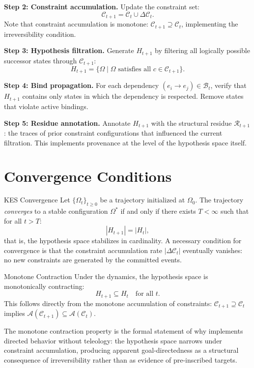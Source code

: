 \textbf{Step 2: Constraint accumulation.} Update the constraint set:
\[
  \mathcal{C}_{t+1} = \mathcal{C}_t \cup \Delta\mathcal{C}_t.
\]
Note that constraint accumulation is monotone: $\mathcal{C}_{t+1} \supseteq
\mathcal{C}_t$, implementing the irreversibility condition.

\textbf{Step 3: Hypothesis filtration.} Generate $H_{t+1}$ by filtering all
logically possible successor states through $\mathcal{C}_{t+1}$:
\[
  H_{t+1} = \bigl\{\Omega \mid \Omega \text{ satisfies all } c \in \mathcal{C}_{t+1}\bigr\}.
\]

\textbf{Step 4: Bind propagation.} For each dependency $(e_i \to e_j) \in
\mathcal{B}_t$, verify that $H_{t+1}$ contains only states in which the
dependency is respected. Remove states that violate active bindings.

\textbf{Step 5: Residue annotation.} Annotate $H_{t+1}$ with the structural
residue $\mathcal{R}_{t+1}$: the traces of prior constraint configurations
that influenced the current filtration. This implements provenance at the
level of the hypothesis space itself.

\section{Convergence Conditions}

\begin{theorem}{KES Convergence}
Let $\{\Omega_t\}_{t \geq 0}$ be a \KES trajectory initialized at $\Omega_0$.
The trajectory \emph{converges} to a stable configuration $\Omega^*$ if and
only if there exists $T < \infty$ such that for all $t > T$:
\[
  |H_{t+1}| = |H_t|,
\]
that is, the hypothesis space stabilizes in cardinality. A necessary condition
for convergence is that the constraint accumulation rate $|\Delta\mathcal{C}_t|$
eventually vanishes: no new constraints are generated by the committed events.
\end{theorem}

\begin{proposition}{Monotone Contraction}
Under the \KES dynamics, the hypothesis space is monotonically contracting:
\[
  H_{t+1} \subseteq H_t \quad \text{for all } t.
\]
This follows directly from the monotone accumulation of constraints:
$\mathcal{C}_{t+1} \supseteq \mathcal{C}_t$ implies
$\mathcal{A}(\mathcal{C}_{t+1}) \subseteq \mathcal{A}(\mathcal{C}_t)$.
\end{proposition}

The monotone contraction property is the formal statement of why \KES implements
directed behavior without teleology: the hypothesis space narrows under constraint
accumulation, producing apparent goal-directedness as a structural consequence of
irreversibility rather than as evidence of pre-inscribed targets.


